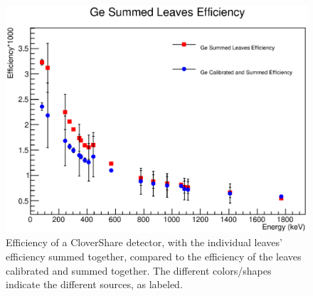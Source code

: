 \begin{figure}
    \centering
    \includegraphics[scale=0.7]{Setup_Figs/Efficiency_ind_vs_sum.eps}
    \caption{Efficiency of a CloverShare detector, with the individual leaves' efficiency summed together, compared to the efficiency of the leaves calibrated and summed together. The different colors/shapes indicate the different sources, as labeled.}
    \label{fig:Clover_ind_vs_sum}
\end{figure}